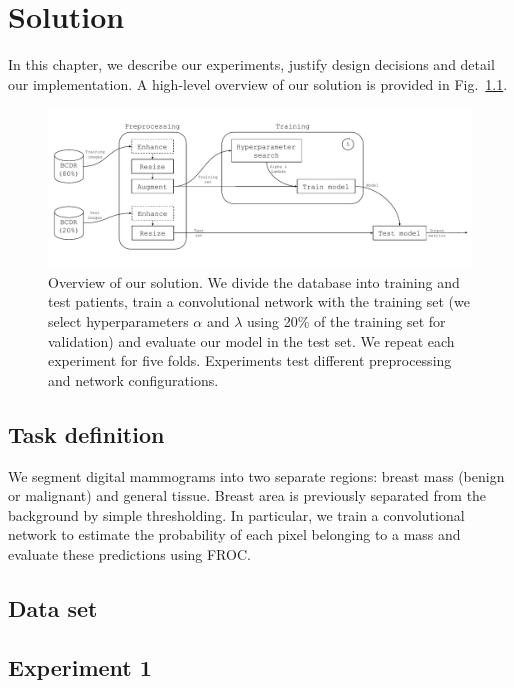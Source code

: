 \chapter{Solution}
\label{ch:Model}

In this chapter, we describe our experiments, justify design decisions and detail our implementation. A high-level overview of our solution is provided in Fig.~\ref{fig:overview}. 
\begin{figure}[ht]
	\centering
	\includegraphics[width=\textwidth]{plots/overview.pdf}
	\caption[Overview of the solution]{Overview of our solution. We divide the database into training and test patients, train a convolutional network with the training set (we select hyperparameters $\alpha$ and $\lambda$ using 20\% of the training set for validation) and evaluate our model in the test set. We repeat each experiment for five folds. Experiments test different preprocessing and network configurations.}
	\label{fig:overview}
\end{figure}

\section{Task definition}
We segment digital mammograms into two separate regions: breast mass (benign or malignant) and general tissue.
Breast area is previously separated from the background by simple thresholding.
In particular, we train a convolutional network to estimate the probability of each pixel belonging to a mass and evaluate these predictions using FROC.

\section{Data set}


\section{Experiment 1}
\label{sec:Experiment1}


